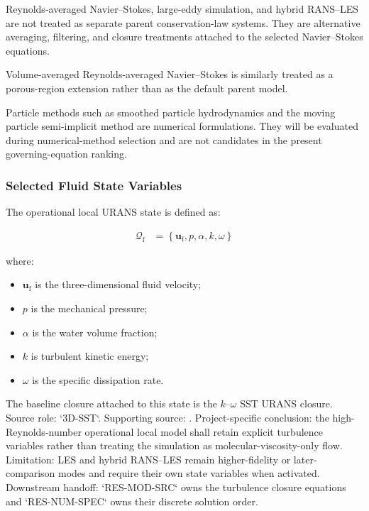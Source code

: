 Reynolds-averaged Navier--Stokes, large-eddy simulation, and hybrid
RANS--LES are not treated as separate parent conservation-law systems.
They are alternative averaging, filtering, and closure treatments
attached to the selected Navier--Stokes equations.

Volume-averaged Reynolds-averaged Navier--Stokes is similarly treated
as a porous-region extension rather than as the default parent model.

Particle methods such as smoothed particle hydrodynamics and the moving
particle semi-implicit method are numerical formulations. They will be
evaluated during numerical-method selection and are not candidates in
the present governing-equation ranking.

\subsubsection{Selected Fluid State Variables}
\label{sec:res-mod-eqs-local-state-variables}

The operational local URANS state is defined as:

\begin{align}
  \mathcal{Q}_{\mathrm{f}}
  &=
  \left\{
    \mathbf{u}_{\mathrm{f}},
    p,
    \alpha,
    k,
    \omega
  \right\}
  \label{eq:res-mod-eqs-local-fluid-state}
\end{align}

where:

\begin{itemize}
  \item $\mathbf{u}_{\mathrm{f}}$ is the three-dimensional fluid
    velocity;
  \item $p$ is the mechanical pressure;
  \item $\alpha$ is the water volume fraction;
  \item $k$ is turbulent kinetic energy;
  \item $\omega$ is the specific dissipation rate.
\end{itemize}

The baseline closure attached to this state is the $k$--$\omega$ SST
URANS closure. Source role: `3D-SST`. Supporting source:
\textcite{menter1994twoequation}. Project-specific conclusion: the
high-Reynolds-number operational local model shall retain explicit
turbulence variables rather than treating the simulation as
molecular-viscosity-only flow. Limitation: LES and hybrid RANS--LES
remain higher-fidelity or later-comparison modes and require their own
state variables when activated. Downstream handoff: `RES-MOD-SRC` owns
the turbulence closure equations and `RES-NUM-SPEC` owns their discrete
solution order.

